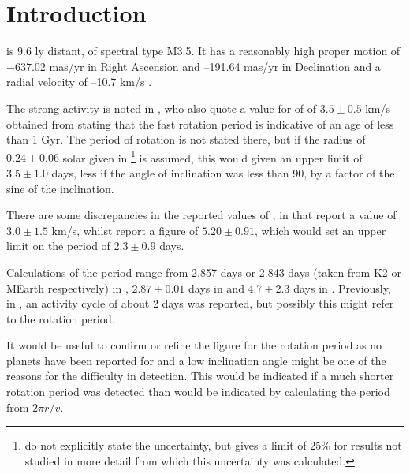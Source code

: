 \section{Introduction}
\protect\label{section:intro}

{\ross} is 9.6 ly distant, of spectral type M3.5. It has a reasonably high
proper motion of $-637.02$ mas/yr in Right Ascension and  {–}191.64 mas/yr
in Declination and a radial velocity of {–}10.7 km/s \citep{vanleeuwen07}.

The strong activity is noted in \citet{wargelin08}, who also quote a value for
{\vsini} of of $3.5 \pm 0.5$ km/s obtained from \citet{johnskrull96} stating
that the fast rotation period is indicative of an age of less than 1 Gyr.
The period of rotation is not stated there, but if
the radius of $0.24 \pm 0.06$ solar given in
\citet{johnson83}\footnote{\citet{johnson83} do not explicitly state the
uncertainty, but gives a limit of 25\% for results not studied in more detail
from which this uncertainty was calculated.} is assumed, this would given an
upper limit of $3.5 \pm 1.0$ days, less if the angle of inclination was less than 90\degree, by a factor of the sine of the inclination.

There are some discrepancies in the reported values of \vsini, in that
\citet{reiners18} report a value of $3.0 \pm 1.5$ km/s, whilst
\citet{hojjatpanah19} report a figure of $5.20 \pm 0.91$, which would set an
upper limit on the period of $2.3 \pm 0.9$ days.

Calculations of the period range from 2.857 days or 2.843 days (taken from K2
or MEarth respectively) in \citet{newton18}, $2.87 \pm 0.01$ days in
\citet{diezalonso19} and $4.7 \pm 2.3$ days in \citet{reiners18}. Previously,
in \citet{jarrett76}, an activity cycle of about 2 days was reported, but
possibly this might refer to the rotation period.

It would be useful to confirm or refine the figure for
the rotation period as no planets have been reported for {\ross}
and a low inclination angle might be one of the
reasons for the difficulty in detection. This would be indicated if a much
shorter rotation period was detected than would be indicated by calculating the
period from $2\pi r / v$.
